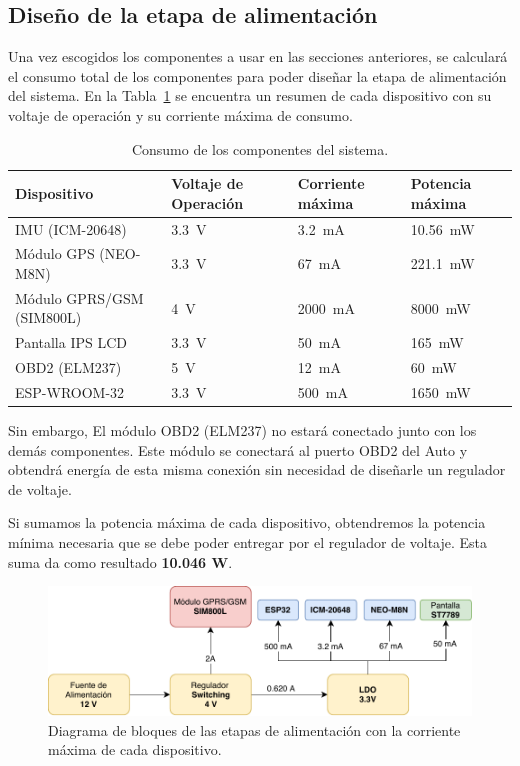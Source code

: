 \subsection{Diseño de la etapa de alimentación}
Una vez escogidos los componentes a usar en las secciones anteriores, se calculará el consumo total de los componentes para poder diseñar la etapa de alimentación del sistema. En la Tabla~\ref{diag:consumo} se encuentra un resumen de cada dispositivo con su voltaje de operación y su corriente máxima de consumo.

\bgroup
\def\arraystretch{1.5}%
\begin{table}[htbp!]
\centering
\caption[Consumo de los componentes del sistema]{Consumo de los componentes del sistema.}
\begin{tabular}{@{}lp{2cm}p{2cm}p{2cm}@{}}
\toprule
Dispositivo & Voltaje de Operación & Corriente máxima & Potencia máxima\\ \midrule
IMU (ICM-20648) & \SI{3.3}{V} & \SI{3.2}{\mA} & \SI{10.56}{\mW} \\
Módulo GPS (NEO-M8N) & \SI{3.3}{V} & \SI{67}{mA} & \SI{221,1}{\mW}\\
Módulo GPRS/GSM (SIM800L) & \SI{4}{V} & \SI{2000}{mA} & \SI{8000}{\mW}\\
Pantalla IPS LCD & \SI{3.3}{V} & \SI{50}{mA} & \SI{165}{\mW}\\
OBD2 (ELM237) & \SI{5}{V} & \SI{12}{mA} & \SI{60}{\mW}\\
ESP-WROOM-32 & \SI{3.3}{V} & \SI{500}{mA} & \SI{1650}{\mW}\\ \bottomrule
\end{tabular}
\label{diag:consumo}
\end{table}
\egroup

Sin embargo, El módulo OBD2 (ELM237) no estará conectado junto con los demás componentes. Este módulo se conectará al puerto OBD2 del Auto y obtendrá energía de esta misma conexión sin necesidad de diseñarle un regulador de voltaje.


Si sumamos la potencia máxima de cada dispositivo, obtendremos la potencia mínima necesaria que se debe poder entregar por el regulador de voltaje. Esta suma da como resultado \textbf{10.046 W}.


\begin{figure}[hbtp!]
\centering
\includegraphics[width=\textwidth]{Bloques_Alimentacion.pdf}
\captionsetup{justification=centering,margin=2cm}
\caption{Diagrama de bloques de las etapas de alimentación con la corriente máxima de cada dispositivo.}
\label{fig:bloques_alim}
\end{figure}

